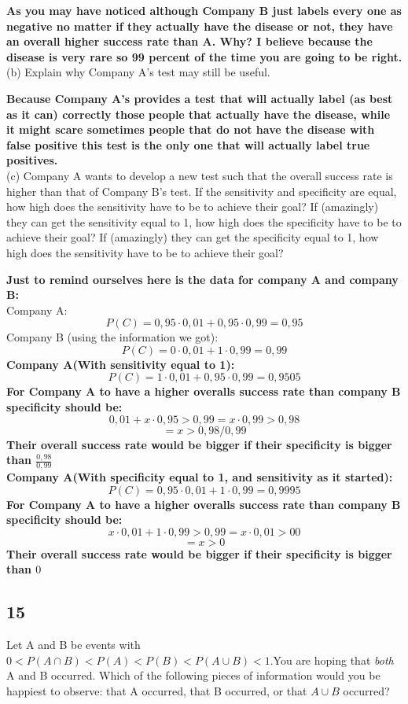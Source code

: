 \documentclass{article}
\begin{document}
\textbf{As you may have noticed although Company B just labels every one as negative no matter if they actually have the disease or not, they have an overall higher success rate than A. Why? I believe because the disease is very rare so 99 percent of the time you are going to be right.}
\\
(b) Explain why Company A’s test may still be useful.

\textbf{Because Company A's provides a test that will actually label (as best as it can) correctly those people that actually have the disease, while it might scare sometimes people that do not have the disease with false positive this test is the only one that will actually label true positives.}\\
(c) Company A wants to develop a new test such that the overall success rate is higher than that of Company B’s test. If the sensitivity and specificity are equal, how high does the sensitivity have to be to achieve their goal? If (amazingly) they can get the sensitivity equal to 1, how high does the specificity have to be to achieve their goal? If (amazingly) they can get the specificity equal to 1, how high does the sensitivity have to be to achieve their goal?

\textbf{Just to remind ourselves here is the data for company A and company B:}\\
Company A:
$$P(C)=0,95 \cdot 0,01 + 0,95 \cdot 0,99=0,95$$
Company B (using the information we got):
$$P(C)=0 \cdot 0,01 + 1 \cdot 0,99=0,99$$
\textbf{Company A(With sensitivity equal to 1):}
$$P(C)=1 \cdot 0,01 + 0,95 \cdot 0,99=0,9505$$
\textbf{For Company A to have a higher overalls success rate than company B specificity should be:}
$$0,01+x \cdot 0,95 >0,99=x \cdot 0,99 >0,98$$
$$=x>0,98/0,99$$
\textbf{Their overall success rate would be bigger if their specificity is bigger than $\frac{0,98}{0,99}$}\\
\textbf{Company A(With specificity equal to 1, and sensitivity as it started):}
$$P(C)=0,95 \cdot 0,01 + 1 \cdot 0,99=0,9995$$
\textbf{For Company A to have a higher overalls success rate than company B specificity should be:}
$$x \cdot 0,01+1 \cdot 0,99 >0,99=x \cdot 0,01 >00$$
$$=x>0$$
\textbf{Their overall success rate would be bigger if their specificity is bigger than $0$}
\subsection{15}Let A and B be events with $0<P(A\cap B)<P(A)<P(B)<P(A \cup B)<1$.You are hoping that \textit{both} A and B occurred. Which of the following pieces of information would you be happiest to observe: that A occurred, that B occurred, or that $A \cup B$ occurred?
\end{document}
